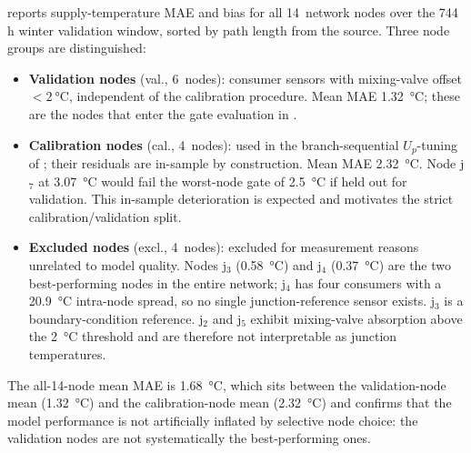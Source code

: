 \documentclass[a4paper,fleqn]{cas-dc}
\begin{document}
 reports supply-temperature MAE and bias
for all 14~network nodes over the 744\,h winter validation window,
sorted by path length from the source. Three node groups are
distinguished:
%
\begin{itemize}[nosep]
  \item \textbf{Validation nodes} (val., 6~nodes): consumer sensors
        with mixing-valve offset ${<}\SI{2}{\celsius}$,
        independent of the calibration procedure. Mean MAE
        \SI{1.32}{\celsius}; these are the nodes that enter the
        gate evaluation in .
  \item \textbf{Calibration nodes} (cal., 4~nodes): used in the
        branch-sequential $U_p$-tuning of
        \citet{Maldonado2024}; their residuals are in-sample by
        construction. Mean MAE \SI{2.32}{\celsius}. Node j$_7$ at
        \SI{3.07}{\celsius} would fail the worst-node gate of
        \SI{2.5}{\celsius} if held out for validation. This
        in-sample deterioration is expected and motivates the
        strict calibration/validation split.
  \item \textbf{Excluded nodes} (excl., 4~nodes): excluded for
        measurement reasons unrelated to model quality. Nodes
        j$_3$ (\SI{0.58}{\celsius}) and j$_4$
        (\SI{0.37}{\celsius}) are the two best-performing nodes
        in the entire network; j$_4$ has four consumers with a
        \SI{20.9}{\celsius} intra-node spread, so no single
        junction-reference sensor exists. j$_3$ is a
        boundary-condition reference. j$_2$ and j$_5$ exhibit
        mixing-valve absorption above the \SI{2}{\celsius}
        threshold and are therefore not interpretable as junction
        temperatures.
\end{itemize}
%
The all-14-node mean MAE is \SI{1.68}{\celsius}, which sits
between the validation-node mean (\SI{1.32}{\celsius}) and the
calibration-node mean (\SI{2.32}{\celsius}) and confirms that the
model performance is not artificially inflated by selective node
choice: the validation nodes are not systematically the
best-performing ones.
\end{document}
